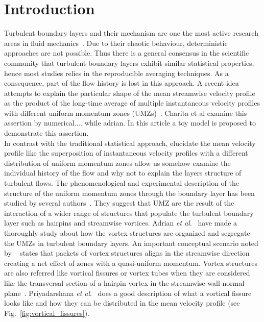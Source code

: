 \documentclass[aps,reprint,amsmath,amssymb,pra]{revtex4-1}%
\begin{document}
\section{\label{sec:intro} Introduction}
Turbulent boundary layers and their mechanism are one the most active research areas in fluid mechanics~\citep{kline1967,head1981,heist2000}. Due to their chaotic behaviour, deterministic approaches are not possible. Thus there is a general consensus in the scientific community that turbulent boundary layers exhibit similar statistical properties, hence most studies relies in the reproducible averaging techniques.  As a consequence, part of the flow history is lost in this approach. A recent idea attempts to explain the particular shape of the mean streamwise velocity profile as the product of the long-time average of multiple instantaneous velocity profiles with different uniform momentum zones (UMZs)~\citep{mca1995,umz2015}. Charita et al examine this assertion by numerical.... while adrian. In this article a toy model is proposed to demonstrate this assertion.\\
In contrast with the traditional statistical approach, elucidate the mean velocity profile like the superposition of instantaneous velocity profiles with a different distribution of uniform momentum zones allow us somehow examine the individual history of the flow and why not to explain the layers structure of turbulent flows.
The phenomenological and experimental description of the structure of the uniform momentum zones through the boundary layer has been studied by several authors~\citep{mca1995,amt2000,umz2015}. They suggest that UMZ are the result of the interaction of a wider range of structures that populate the turbulent boundary layer\cite{amt2000} such as hairpins and streamwise vortices. Adrian \textit{et al}.~\cite{amt2000} have made a thoroughly  study about how the vortex structures are organized and segregate the UMZs in turbulent boundary layers. An important conceptual scenario noted by ~\cite{amt2000} states that packets of vortex structures aligns in the streamwise direction creating a net effect of zones with a quasi-uniform momentum. Vortex structures are also referred like vortical fissures or vortex tubes when they are considered like the transversal section of a hairpin vortex in the streamwise-wall-normal plane~\cite{amt2000}.  
Priyadarshana \textit{et al}.~\citep{priya2007} does a good description of what a vortical fissure looks like and how they can be distributed in the mean velocity profile (see Fig.~\ref{fig:vortical_fissures}). 
\end{document}
